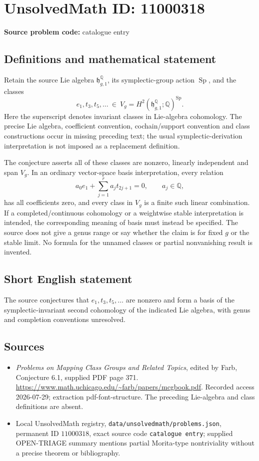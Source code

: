 \documentclass[11pt]{article}
\newcommand{\Q}{\mathbb{Q}}
\begin{document}
\section*{UnsolvedMath ID: 11000318}
\textbf{Source problem code:} catalogue entry
\subsection{Definitions and mathematical statement}
Retain the source Lie algebra \(\mathfrak h_{g,1}^{\Q}\), its symplectic-group action \(\operatorname{Sp}\), and the classes
\[
 e_1,t_3,t_5,\ldots\ \in\
 V_g=H^2(\mathfrak h_{g,1}^{\Q};\Q)^{\operatorname{Sp}}.
\]
Here the superscript denotes invariant classes in Lie-algebra cohomology. The precise Lie algebra, coefficient convention, cochain/support convention and class constructions occur in missing preceding text; the usual symplectic-derivation interpretation is not imposed as a replacement definition.

The conjecture asserts all of these classes are nonzero, linearly independent and span \(V_g\). In an ordinary vector-space basis interpretation, every relation
\[
 a_0e_1+\sum_{j=1}^{r}a_jt_{2j+1}=0,
 \qquad a_j\in\Q,
\]
has all coefficients zero, and every class in \(V_g\) is a finite such linear combination. If a completed/continuous cohomology or a weightwise stable interpretation is intended, the corresponding meaning of basis must instead be specified. The source does not give a genus range or say whether the claim is for fixed \(g\) or the stable limit. No formula for the unnamed classes or partial nonvanishing result is invented.
\subsection{Short English statement}
The source conjectures that \(e_1,t_3,t_5,\ldots\) are nonzero and form a basis of the symplectic-invariant second cohomology of the indicated Lie algebra, with genus and completion conventions unresolved.
\subsection{Sources}
\begin{itemize}
\item \emph{Problems on Mapping Class Groups and Related Topics}, edited by Farb, Conjecture 6.1, supplied PDF page 371. \url{https://www.math.uchicago.edu/~farb/papers/mcgbook.pdf}. Recorded access 2026-07-29; extraction pdf-font-structure. The preceding Lie-algebra and class definitions are absent.
\item Local UnsolvedMath registry, \texttt{data/unsolvedmath/problems.json}, permanent ID \(11000318\), exact source code \texttt{catalogue entry}; supplied OPEN-TRIAGE summary mentions partial Morita-type nontriviality without a precise theorem or bibliography.
\end{itemize}
\end{document}
